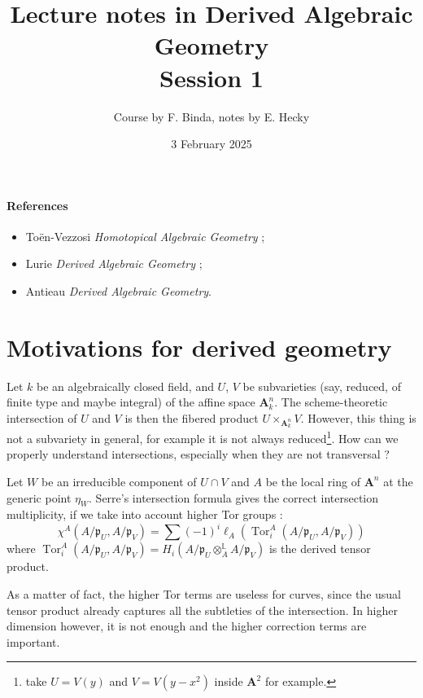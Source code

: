 \documentclass[11pt]{article}
\title{Lecture notes in Derived Algebraic Geometry\\Session 1}
\date{3 February 2025}
\author{Course by F. Binda, notes by E. Hecky}
\theoremstyle{definition}
\newcommand{\A}{\mathbf{A}}
\renewcommand{\L}{\mathbb{L}}
\newcommand{\p}{\mathfrak{p}}
\newcommand{\Tor}{\operatorname{Tor}}
\begin{document}
\maketitle

\paragraph*{References}
\begin{itemize}
    \item Toën-Vezzosi \emph{Homotopical Algebraic Geometry} ;
    \item Lurie \emph{Derived Algebraic Geometry} ;
    \item Antieau \emph{Derived Algebraic Geometry}.
\end{itemize}

\section*{Motivations for derived geometry}

Let $k$ be an algebraically closed field, and $U$, $V$ be subvarieties (say, reduced, of finite type and maybe integral) of the affine space $\A^n_k$.
The scheme-theoretic intersection of $U$ and $V$ is then the fibered product $U \times_{\A^n_k} V$.
However, this thing is not a subvariety in general, for example it is not always reduced\footnote{take $U = V(y)$ and $V = V(y - x^2)$ inside $\A^2$ for example.}.
How can we properly understand intersections, especially when they are not transversal ?

Let $W$ be an irreducible component of $U \cap V$ and $A$ be the local ring of $\A^n$ at the generic point $\eta_W$.
Serre's intersection formula gives the correct intersection multiplicity, if we take into account higher Tor groups :
\[
    \chi^A(A/\p_U, A/\p_V) = \sum (-1)^i \ell_A(\Tor^A_i(A/\p_U, A/\p_V))
\]
where $\Tor^A_i(A/\p_U, A/\p_V) = H_i(A/\p_U \otimes_A^{\L} A/\p_V)$ is the derived tensor product.

As a matter of fact, the higher Tor terms are useless for curves, since the usual tensor product already captures all the subtleties of the intersection.
In higher dimension however, it is not enough and the higher correction terms are important.
\end{document}
